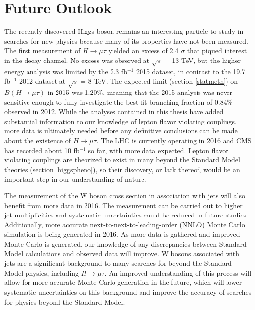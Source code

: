 \documentclass[oneside, letterpaper, oldfontcommands]{memoir}
\let\oldbib
\renewcommand*{}{\SingleSpace\oldbib}
\begin{document}
\section{Future Outlook}
\qquad The recently discovered Higgs boson remains an interesting particle to study in searches for new physics because many of its properties have not been measured. The first measurement of $H \rightarrow \mu\tau$ yielded an excess of 2.4 $\sigma$ that piqued interest in the decay channel. No excess was observed at $\sqrt{s}$ = 13 TeV, but the higher energy analysis was limited by the 2.3 fb$^{-1}$ 2015 dataset, in contrast to the 19.7 fb$^{-1}$ 2012 dataset at $\sqrt{s}$ = 8 TeV. The expected limit (section \ref{statmeth}) on $B(H \rightarrow \mu \tau)$ in 2015 was 1.20\%, meaning that the 2015 analysis was never sensitive enough to fully investigate the best fit branching fraction of 0.84\% observed in 2012. While the analyses contained in this thesis have added substantial information to our knowledge of lepton flavor violating couplings, more data is ultimately needed before any definitive conclusions can be made about the existence of $H \rightarrow \mu\tau$. The LHC is currently operating in 2016 and CMS has recorded about 10 fb$^{-1}$ so far, with more data expected. Lepton flavor violating couplings are theorized to exist in many beyond the Standard Model theories (section \ref{higgspheno}), so their discovery, or lack thereof, would be an important step in our understanding of nature.


\qquad The measurement of the W boson cross section in association with jets will also benefit from more data in 2016. The measurement can be carried out to higher jet multiplicities and systematic uncertainties could be reduced in future studies. Additionally, more accurate next-to-next-to-leading-order (NNLO) Monte Carlo simulation is being generated in 2016. As more data is gathered and improved Monte Carlo is generated, our knowledge of any discrepancies between Standard Model calculations and observed data will improve. W bosons associated with jets are a significant background to many searches for beyond the Standard Model physics, including $H \rightarrow \mu\tau$. An improved understanding of this process will allow for more accurate Monte Carlo generation in the future, which will lower systematic uncertainties on this background and improve the accuracy of searches for physics beyond the Standard Model.



%
%


\end{document}
